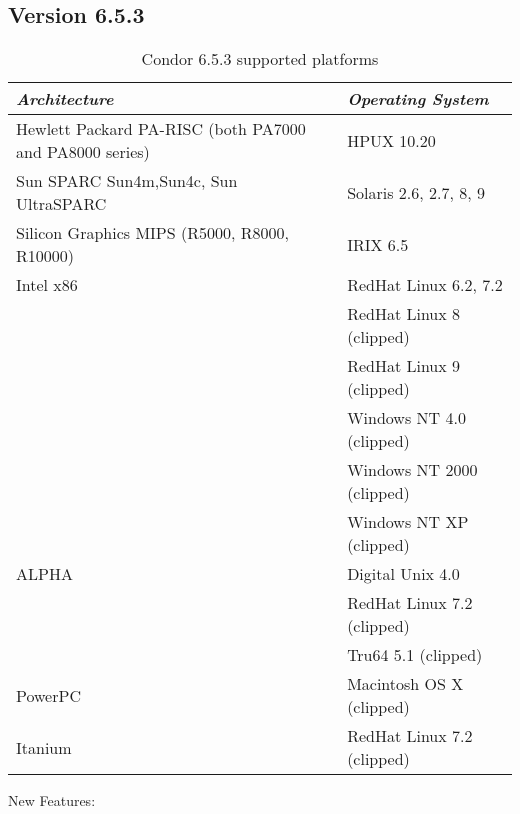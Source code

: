 \subsection{\label{sec:New-6-5-3}Version 6.5.3}

\begin{center}
\begin{table}[hbt]
\begin{tabular}{|ll|} \hline
\emph{Architecture} & \emph{Operating System} \\ \hline \hline
Hewlett Packard PA-RISC (both PA7000 and PA8000 series) & HPUX 10.20 \\ \hline
Sun SPARC Sun4m,Sun4c, Sun UltraSPARC & Solaris 2.6, 2.7, 8, 9 \\ \hline
Silicon Graphics MIPS (R5000, R8000, R10000) & IRIX 6.5 \\ \hline
Intel x86 & RedHat Linux 6.2, 7.2 \\
 & RedHat Linux 8 (clipped) \\ \hline
 & RedHat Linux 9 (clipped) \\ \hline
 & Windows NT 4.0 (clipped) \\ \hline
 & Windows NT 2000 (clipped) \\ \hline
 & Windows NT XP (clipped) \\ \hline
ALPHA & Digital Unix 4.0 \\
 & RedHat Linux 7.2 (clipped) \\ \hline
 & Tru64 5.1 (clipped) \\ \hline
PowerPC & Macintosh OS X (clipped) \\
Itanium & RedHat Linux 7.2 (clipped) \\
\end{tabular}
\caption{\label{vers-hist-sup-plat}Condor 6.5.3 supported platforms}
\end{table}
\end{center}

\noindent New Features:


